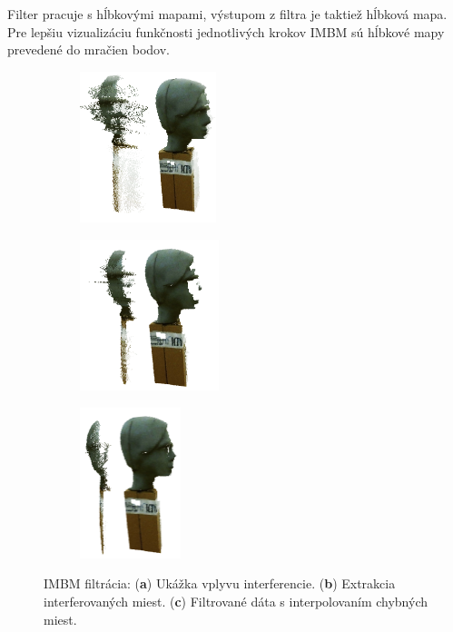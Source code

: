 Filter pracuje s hĺbkovými mapami, výstupom z filtra je taktiež hĺbková mapa. Pre lepšiu vizualizáciu funkčnosti jednotlivých krokov IMBM sú hĺbkové mapy prevedené do mračien bodov.  

\begin{figure}[h]
	\centering
	\begin{subfigure}[b]{0.32\textwidth}
		\centering
		\includegraphics[height=4.4cm]{figures/prepared_models_a.png}
		\caption{}
		\label{fig:imbm:result:a}
	\end{subfigure}
	\hfill
	\begin{subfigure}[b]{0.32\textwidth}
		\centering
		\includegraphics[height=4.4cm]{figures/prepared_models_b.png}
		\caption{}
		\label{fig:imbm:result:b}
	\end{subfigure}
	\hfill
	\begin{subfigure}[b]{0.32\textwidth}
		\centering
		\includegraphics[height=4.4cm]{figures/prepared_models_c.png}
		\caption{}
		\label{fig:imbm:result:c}
	\end{subfigure}
	\caption{IMBM filtrácia: (\textbf{a}) Ukážka vplyvu interferencie. (\textbf{b}) Extrakcia interferovaných miest. (\textbf{c}) Filtrované dáta s interpolovaním chybných miest.}
	\label{fig:imbm:result}
\end{figure}

